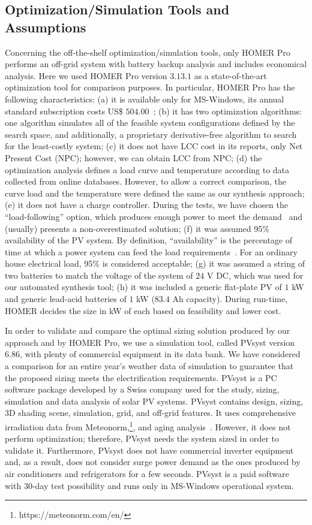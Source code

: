 \documentclass[runningheads]{llncs}
\begin{document}
\subsection{Optimization/Simulation Tools and Assumptions}
Concerning the off-the-shelf optimization/simulation tools, only HOMER Pro performs an off-grid system with battery backup analysis and includes economical analysis. Here we used HOMER Pro version $3.13.1$ as a state-of-the-art optimization tool for comparison purposes. In particular, HOMER Pro has the following characteristics:
(a) it is available only for MS-Windows, its annual standard subscription costs US\$ $504.00$~\cite{HOMER}; 
(b) it has two optimization algorithms: one algorithm simulates all of the feasible system configurations defined by the search space, and additionally, a proprietary derivative-free algorithm to search for the least-costly system;
(c) it does not have LCC cost in its reports, only Net Present Cost (NPC); however, we can obtain LCC from NPC; 
(d) the optimization analysis defines a load curve and temperature according to data collected from online databases. However, to allow a correct comparison, the curve load and the temperature were defined the same as our synthesis approach; 
(e) it does not have a charge controller. During the tests, we have chosen the ``load-following'' option, which produces enough power to meet the demand~\cite{HOMER} and (usually) presents a non-overestimated solution; 
(f) it was assumed 95\% availability of the PV system. By definition, ``availability'' is the percentage of time at which a power system can feed the load requirements~\cite{Khatib2014}. For an ordinary house electrical load, 95\% is considered acceptable;
(g) it was assumed a string of two batteries to match the voltage of the system of $24$ V DC, which was used for our automated synthesis tool; 
(h) it was included a generic flat-plate PV of $1$ kW and generic lead-acid batteries of $1$ kW ($83.4$ Ah capacity). During run-time, HOMER decides the size in kW of each based on feasibility and lower cost.

In order to validate and compare the optimal sizing solution produced by our approach and by HOMER Pro, we use a simulation tool, called PVsyst version $6.86$, with plenty of commercial equipment in its data bank. We have considered a comparison for an entire year's weather data of simulation to guarantee that the proposed sizing meets the electrification requirements. PVsyst is a PC software package developed by a Swiss company used for the study, sizing, simulation and data analysis of solar PV systems. PVsyst contains design, sizing, 3D shading scene, simulation, grid, and off-grid features. It uses comprehensive irradiation data from Meteonorm,\footnote{https://meteonorm.com/en/}, and aging analysis~\cite{PVsyst2017}. However, it does not perform optimization; therefore, PVsyst needs the system sized in order to validate it. Furthermore, PVsyst does not have commercial inverter equipment and, as a result, does not consider surge power demand as the ones produced by air conditioners and refrigerators for a few seconds. PVsyst is a paid software with $30$-day test possibility and runs only in MS-Windows operational system.
\end{document}
